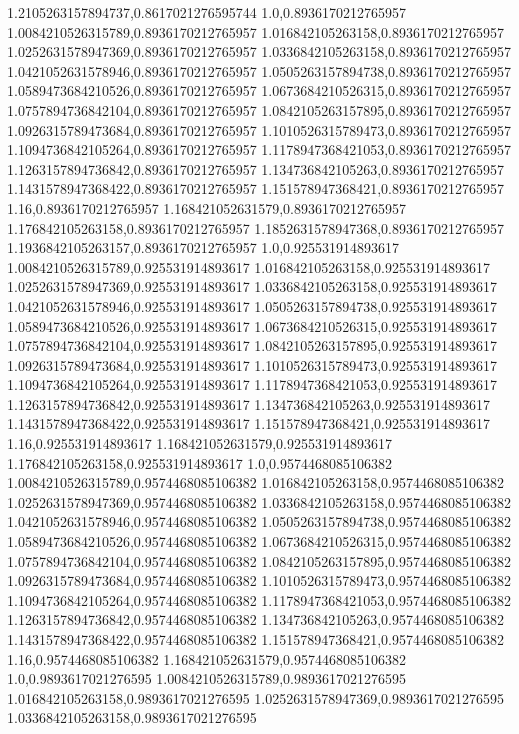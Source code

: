 1.2105263157894737,0.8617021276595744
1.0,0.8936170212765957
1.0084210526315789,0.8936170212765957
1.016842105263158,0.8936170212765957
1.0252631578947369,0.8936170212765957
1.0336842105263158,0.8936170212765957
1.0421052631578946,0.8936170212765957
1.0505263157894738,0.8936170212765957
1.0589473684210526,0.8936170212765957
1.0673684210526315,0.8936170212765957
1.0757894736842104,0.8936170212765957
1.0842105263157895,0.8936170212765957
1.0926315789473684,0.8936170212765957
1.1010526315789473,0.8936170212765957
1.1094736842105264,0.8936170212765957
1.1178947368421053,0.8936170212765957
1.1263157894736842,0.8936170212765957
1.134736842105263,0.8936170212765957
1.1431578947368422,0.8936170212765957
1.151578947368421,0.8936170212765957
1.16,0.8936170212765957
1.168421052631579,0.8936170212765957
1.176842105263158,0.8936170212765957
1.1852631578947368,0.8936170212765957
1.1936842105263157,0.8936170212765957
1.0,0.925531914893617
1.0084210526315789,0.925531914893617
1.016842105263158,0.925531914893617
1.0252631578947369,0.925531914893617
1.0336842105263158,0.925531914893617
1.0421052631578946,0.925531914893617
1.0505263157894738,0.925531914893617
1.0589473684210526,0.925531914893617
1.0673684210526315,0.925531914893617
1.0757894736842104,0.925531914893617
1.0842105263157895,0.925531914893617
1.0926315789473684,0.925531914893617
1.1010526315789473,0.925531914893617
1.1094736842105264,0.925531914893617
1.1178947368421053,0.925531914893617
1.1263157894736842,0.925531914893617
1.134736842105263,0.925531914893617
1.1431578947368422,0.925531914893617
1.151578947368421,0.925531914893617
1.16,0.925531914893617
1.168421052631579,0.925531914893617
1.176842105263158,0.925531914893617
1.0,0.9574468085106382
1.0084210526315789,0.9574468085106382
1.016842105263158,0.9574468085106382
1.0252631578947369,0.9574468085106382
1.0336842105263158,0.9574468085106382
1.0421052631578946,0.9574468085106382
1.0505263157894738,0.9574468085106382
1.0589473684210526,0.9574468085106382
1.0673684210526315,0.9574468085106382
1.0757894736842104,0.9574468085106382
1.0842105263157895,0.9574468085106382
1.0926315789473684,0.9574468085106382
1.1010526315789473,0.9574468085106382
1.1094736842105264,0.9574468085106382
1.1178947368421053,0.9574468085106382
1.1263157894736842,0.9574468085106382
1.134736842105263,0.9574468085106382
1.1431578947368422,0.9574468085106382
1.151578947368421,0.9574468085106382
1.16,0.9574468085106382
1.168421052631579,0.9574468085106382
1.0,0.9893617021276595
1.0084210526315789,0.9893617021276595
1.016842105263158,0.9893617021276595
1.0252631578947369,0.9893617021276595
1.0336842105263158,0.9893617021276595
